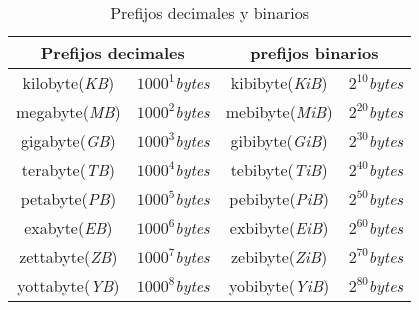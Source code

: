 \documentclass[12pt]{article}
\begin{document}
\begin{table}[h]

    \centering

    \caption{Prefijos decimales y binarios}
    \label{tablaComparacionPrefijos}

    \begin{tabular}{ | c | c | c | c | }
        \hline
        \multicolumn{2}{|c|}{\textbf{Prefijos decimales}} &
        \multicolumn{2}{|c|}{\textbf{prefijos binarios}}\\
        \hline
        \hline
        kilobyte(\emph{KB}) & $1000^{1}$\emph{bytes} &
        kibibyte(\emph{KiB}) & $2^{10}$\emph{bytes} \\
        \hline
        megabyte(\emph{MB}) & $1000^{2}$\emph{bytes} &
        mebibyte(\emph{MiB}) & $2^{20}$\emph{bytes} \\
        \hline
        gigabyte(\emph{GB}) & $1000^{3}$\emph{bytes} &
        gibibyte(\emph{GiB}) & $2^{30}$\emph{bytes} \\
        \hline
        terabyte(\emph{TB}) & $1000^{4}$\emph{bytes} &
        tebibyte(\emph{TiB}) & $2^{40}$\emph{bytes} \\
        \hline
        petabyte(\emph{PB}) & $1000^{5}$\emph{bytes} &
        pebibyte(\emph{PiB}) & $2^{50}$\emph{bytes} \\
        \hline
        exabyte(\emph{EB}) & $1000^{6}$\emph{bytes} &
        exbibyte(\emph{EiB}) & $2^{60}$\emph{bytes} \\
        \hline
        zettabyte(\emph{ZB}) & $1000^{7}$\emph{bytes} &
        zebibyte(\emph{ZiB}) & $2^{70}$\emph{bytes} \\
        \hline
        yottabyte(\emph{YB}) & $1000^{8}$\emph{bytes} &
        yobibyte(\emph{YiB}) & $2^{80}$\emph{bytes} \\
        \hline
    \end{tabular}

\end{table}
\end{document}
